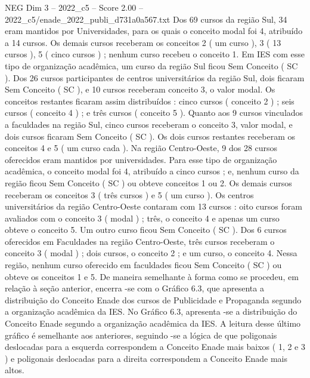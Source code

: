 \begin{textsample}{NEG Dim 3 – 2022\_c5 – Score 2.00 – 2022\_c5/enade\_2022\_publi\_d731a0a567.txt}
Dos 69 cursos da região Sul, 34 eram mantidos por Universidades, para os quais o conceito modal foi 4, atribuído a 14 cursos.
Os demais cursos receberam os conceitos 2 ( um curso ), 3 ( 13 cursos ), 5 ( cinco cursos ) ; nenhum curso recebeu o conceito 1.
Em IES com esse tipo de organização acadêmica, um curso da região Sul ficou Sem Conceito ( SC ).
Dos 26 cursos participantes de centros universitários da região Sul, dois ficaram Sem Conceito ( SC ), e 10 cursos receberam conceito 3, o valor modal.
Os conceitos restantes ficaram assim distribuídos : cinco cursos ( conceito 2 ) ; seis cursos ( conceito 4 ) ; e três cursos ( conceito 5 ).
Quanto aos 9 cursos vinculados a faculdades na região Sul, cinco cursos receberam o conceito 3, valor modal, e dois cursos ficaram Sem Conceito ( SC ).
Os dois cursos restantes receberam os conceitos 4 e 5 ( um curso cada ).
Na região Centro-Oeste, 9 dos 28 cursos oferecidos eram mantidos por universidades.
Para esse tipo de organização acadêmica, o conceito modal foi 4, atribuído a cinco cursos ; e, nenhum curso da região ficou Sem Conceito ( SC ) ou obteve conceitos 1 ou 2.
Os demais cursos receberam os conceitos 3 ( três cursos ) e 5 ( um curso ).
Os centros universitários da região Centro-Oeste contaram com 13 cursos : oito cursos foram avaliados com o conceito 3 ( modal ) ; três, o conceito 4 e apenas um curso obteve o conceito 5.
Um outro curso ficou Sem Conceito ( SC ).
Dos 6 cursos oferecidos em Faculdades na região Centro-Oeste, três cursos receberam o conceito 3 ( modal ) ; dois cursos, o conceito 2 ; e um curso, o conceito 4.
Nessa região, nenhum curso oferecido em faculdades ficou Sem Conceito ( SC ) ou obteve os conceitos 1 e 5.
De maneira semelhante à forma como se procedeu, em relação à seção anterior, encerra -se com o Gráfico 6.3, que apresenta a distribuição do Conceito Enade dos cursos de Publicidade e Propaganda segundo a organização acadêmica da IES.
No Gráfico 6.3, apresenta -se a distribuição do Conceito Enade segundo a organização acadêmica da IES.
A leitura desse último gráfico é semelhante aos anteriores, seguindo -se a lógica de que poligonais deslocadas para a esquerda correspondem a Conceito Enade mais baixos ( 1, 2 e 3 ) e poligonais deslocadas para a direita correspondem a Conceito Enade mais altos.

\end{textsample}
